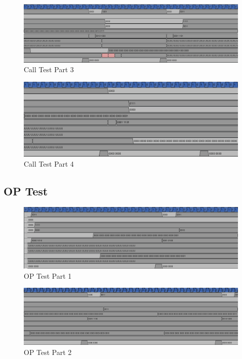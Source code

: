 \begin{figure}[!ht]
    \centering
    \includegraphics[width=\textwidth]{Images/Call Test Part 3.png}
    \caption{Call Test Part 3}
\end{figure}

\begin{figure}[!ht]
    \centering
    \includegraphics[width=\textwidth]{Images/Call Test Part 4.png}
    \caption{Call Test Part 4}
\end{figure}

\clearpage
\subsection*{OP Test}
\begin{figure}[!ht]
    \centering
    \includegraphics[width=\textwidth]{Images/OP Test Part 1.png}
    \caption{OP Test Part 1}
\end{figure}

\begin{figure}[!ht]
    \centering
    \includegraphics[width=\textwidth]{Images/OP Test Part 2.png}
    \caption{OP Test Part 2}
\end{figure}

